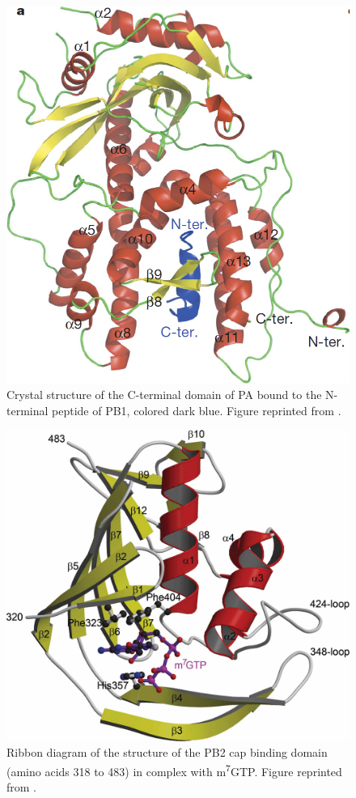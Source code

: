 \begin{figure}
\centering
\includegraphics[width=\linewidth]{Case/InfluenzaPAPB1.png}
\caption{Crystal structure of the C-terminal domain of PA bound to the N-terminal peptide of PB1, colored dark blue. Figure reprinted from \citep{1141}.}
\label{Case:InfluenzaPAPB1}
\end{figure}

\begin{figure}
\centering
\includegraphics[width=\linewidth]{Case/InfluenzaPB2.png}
\caption{Ribbon diagram of the structure of the PB2 cap binding domain (amino acids 318 to 483) in complex with m\textsuperscript{7}GTP. Figure reprinted from \citep{1192}.}
\label{Case:InfluenzaPB2}
\end{figure}

